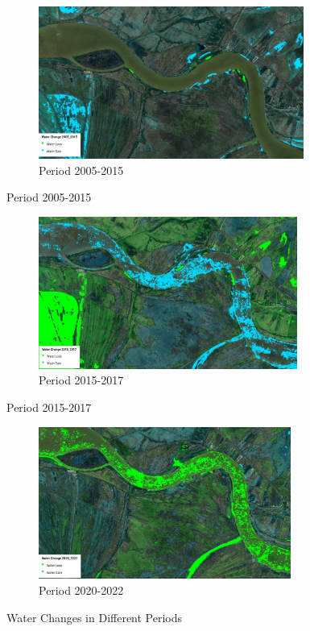 \begin{figure}[H]
    \centering
    \begin{subfigure}[a]{0.6\textwidth}
        \includegraphics[width=\linewidth, height=5cm]{figures/ch5/2005-2015.jpg}
        \caption{Period 2005-2015}
        \label{fig:Period 2005-2015}
    \end{subfigure}
\end{figure}

\begin{figure}[H]
    \centering
    \begin{subfigure}[b]{0.6\textwidth}
        \includegraphics[width=\linewidth, height=5cm]{figures/ch5/2015-2017.jpg}
        \caption{Period 2015-2017}
        \label{fig:Period 2015-2017}
    \end{subfigure}
\end{figure}

\begin{figure}[H]
    \centering
    \begin{subfigure}[c]{0.6\textwidth}
        \includegraphics[width=\linewidth, height=5cm]{figures/ch5/2020-2022.jpg}
        \caption{Period 2020-2022}
        \label{fig:Period 2020-2022}
    \end{subfigure}
    
    \caption{Water Changes in Different Periods}
    \label{fig:Water Changes}
\end{figure}


